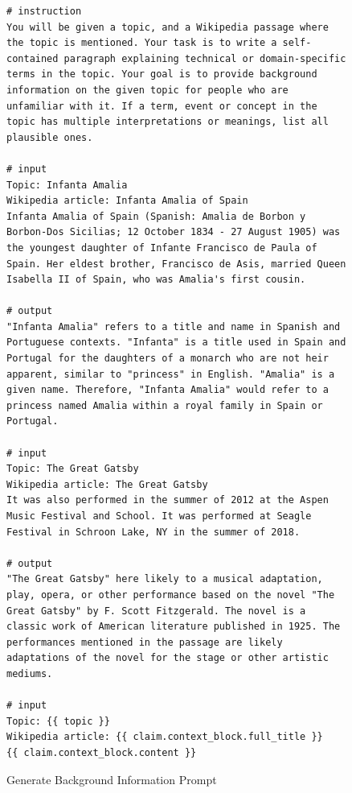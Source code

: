 \documentclass[11pt]{article}
\begin{document}
\begin{figure}[htb]
\begin{lstlisting}
# instruction
You will be given a topic, and a Wikipedia passage where the topic is mentioned. Your task is to write a self-contained paragraph explaining technical or domain-specific terms in the topic. Your goal is to provide background information on the given topic for people who are unfamiliar with it. If a term, event or concept in the topic has multiple interpretations or meanings, list all plausible ones.

# input
Topic: Infanta Amalia
Wikipedia article: Infanta Amalia of Spain
Infanta Amalia of Spain (Spanish: Amalia de Borbon y Borbon-Dos Sicilias; 12 October 1834 - 27 August 1905) was the youngest daughter of Infante Francisco de Paula of Spain. Her eldest brother, Francisco de Asis, married Queen Isabella II of Spain, who was Amalia's first cousin.

# output
"Infanta Amalia" refers to a title and name in Spanish and Portuguese contexts. "Infanta" is a title used in Spain and Portugal for the daughters of a monarch who are not heir apparent, similar to "princess" in English. "Amalia" is a given name. Therefore, "Infanta Amalia" would refer to a princess named Amalia within a royal family in Spain or Portugal.

# input
Topic: The Great Gatsby
Wikipedia article: The Great Gatsby
It was also performed in the summer of 2012 at the Aspen Music Festival and School. It was performed at Seagle Festival in Schroon Lake, NY in the summer of 2018.

# output
"The Great Gatsby" here likely to a musical adaptation, play, opera, or other performance based on the novel "The Great Gatsby" by F. Scott Fitzgerald. The novel is a classic work of American literature published in 1925. The performances mentioned in the passage are likely adaptations of the novel for the stage or other artistic mediums.

# input
Topic: {{ topic }}
Wikipedia article: {{ claim.context_block.full_title }}
{{ claim.context_block.content }}
\end{lstlisting}

\caption{Generate Background Information Prompt}
\label{lst:generate_background_info}
\end{figure}
\end{document}

